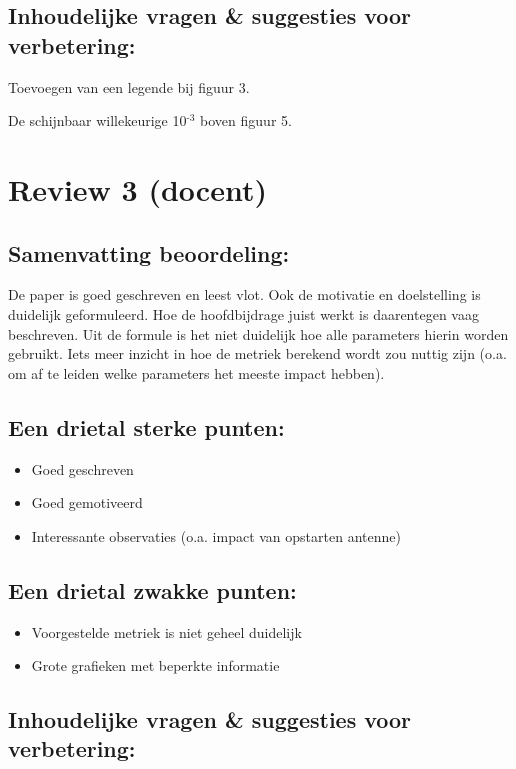 \documentclass[11pt]{article}
\begin{document}
\subsection{Inhoudelijke vragen \& suggesties voor verbetering:}

Toevoegen van een legende bij figuur 3.

De schijnbaar willekeurige 10$^{\text{-3}}$ boven figuur 5.

\section{Review 3 (docent)}

\subsection{Samenvatting beoordeling:}

De paper is goed geschreven en leest vlot. Ook de motivatie en doelstelling is
duidelijk geformuleerd. Hoe de hoofdbijdrage juist werkt is daarentegen vaag
beschreven. Uit de formule is het niet duidelijk hoe alle parameters hierin
worden gebruikt. Iets meer inzicht in hoe de metriek berekend wordt zou nuttig
zijn (o.a. om af te leiden welke parameters het meeste impact hebben).

\subsection{Een drietal sterke punten:}
\begin{itemize}
\item Goed geschreven
\item Goed gemotiveerd
\item Interessante observaties (o.a. impact van opstarten antenne)
\end{itemize}

\subsection{Een drietal zwakke punten:}
\begin{itemize}
\item Voorgestelde metriek is niet geheel duidelijk
\item Grote grafieken met beperkte informatie
\end{itemize}

\subsection{Inhoudelijke vragen \& suggesties voor verbetering:}
\end{document}
